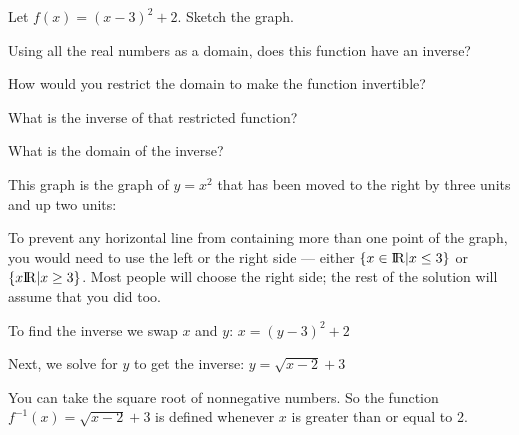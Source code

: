 \begin{Exercise}[title={Find the inverse}, label=simple_inverse]

  Let $f(x) = (x - 3)^2 + 2$.  Sketch the graph.

  Using all the real numbers as a domain, does this function have an inverse?

  How would you restrict the domain to make the function invertible?

  What is the inverse of that restricted function?

  What is the domain of the inverse?

\end{Exercise}
\begin{Answer}[ref=simple_inverse]

  This graph is the graph of $y = x^2$ that has been moved to the right by three units and up two units:
 

To prevent any horizontal line from containing more than one point of
the graph, you would need to use the left or the right side --- either
$\{x \in {\rm I\!R}  | x \leq 3\}$ or $\{x {\rm I\!R}| x \geq 3\}$. Most people will choose the
right side; the rest of the solution will assume that you did too.

To find the inverse we swap $x$ and $y$: $x = (y -3)^2 + 2$

Next, we solve for $y$ to get the inverse: $y = \sqrt{x - 2} + 3$

You can take the square root of nonnegative numbers. So the function
$f^{-1}(x) = \sqrt{x - 2} + 3$ is defined whenever $x$ is greater than
or equal to 2.

\end{Answer}

